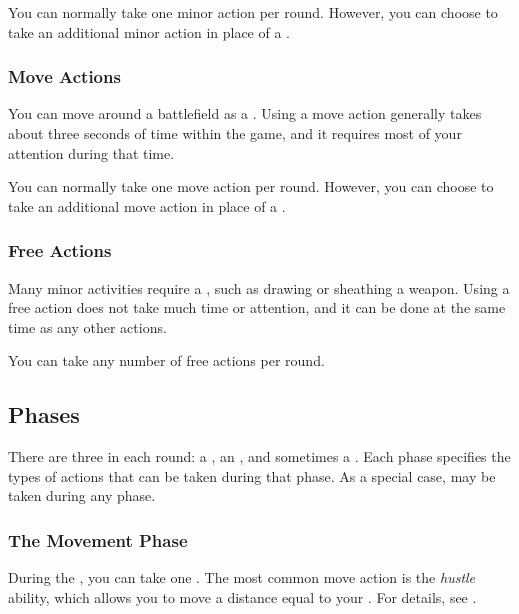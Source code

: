             You can normally take one minor action per round.
            However, you can choose to take an additional minor action in place of a .

        \subsubsection{Move Actions}\label{Move Actions}
            You can move around a battlefield as a .
            Using a move action generally takes about three seconds of time within the game, and it requires most of your attention during that time.

            You can normally take one move action per round.
            However, you can choose to take an additional move action in place of a .

        \subsubsection{Free Actions}\label{Free Actions}
            Many minor activities require a , such as drawing or sheathing a weapon.
            Using a free action does not take much time or attention, and it can be done at the same time as any other actions.

            You can take any number of free actions per round.

    \subsection{Phases}\label{Phases}

        There are three  in each round: a , an , and sometimes a .
        Each phase specifies the types of actions that can be taken during that phase.
        As a special case,  may be taken during any phase.

        \subsubsection{The Movement Phase}\label{The Movement Phase}
            During the , you can take one .
            The most common move action is the \textit{hustle} ability, which allows you to move a distance equal to your .
            For details, see .

